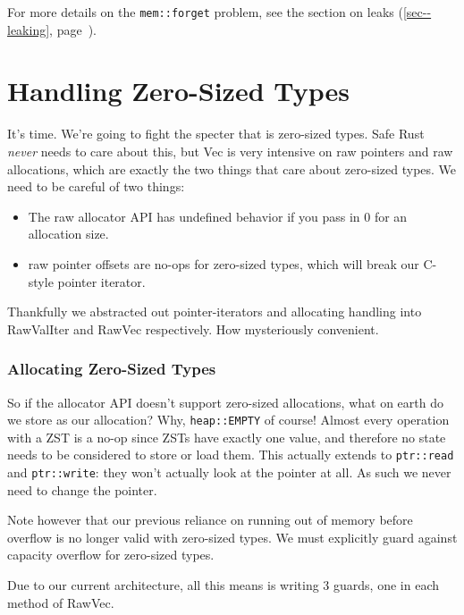 \documentclass[a4paper,]{book}
\renewcommand*{\hyperref}[2][\ar]{%
  \def\ar{#2}%
  #2 (\autoref{#1}, page~\pageref{#1})}
\begin{document}
For more details on the \texttt{mem::forget} problem, see the
\hyperref[sec--leaking]{section on leaks}.

\section{Handling Zero-Sized Types}\label{sec--vec-zsts}

It's time. We're going to fight the specter that is zero-sized types.
Safe Rust \emph{never} needs to care about this, but Vec is very
intensive on raw pointers and raw allocations, which are exactly the two
things that care about zero-sized types. We need to be careful of two
things:

\begin{itemize}
\itemsep1pt\parskip0pt
\item
  The raw allocator API has undefined behavior if you pass in 0 for an
  allocation size.
\item
  raw pointer offsets are no-ops for zero-sized types, which will break
  our C-style pointer iterator.
\end{itemize}

Thankfully we abstracted out pointer-iterators and allocating handling
into RawValIter and RawVec respectively. How mysteriously convenient.

\subsubsection{Allocating Zero-Sized
Types}\label{allocating-zero-sized-types}

So if the allocator API doesn't support zero-sized allocations, what on
earth do we store as our allocation? Why, \texttt{heap::EMPTY} of
course! Almost every operation with a ZST is a no-op since ZSTs have
exactly one value, and therefore no state needs to be considered to
store or load them. This actually extends to \texttt{ptr::read} and
\texttt{ptr::write}: they won't actually look at the pointer at all. As
such we never need to change the pointer.

Note however that our previous reliance on running out of memory before
overflow is no longer valid with zero-sized types. We must explicitly
guard against capacity overflow for zero-sized types.

Due to our current architecture, all this means is writing 3 guards, one
in each method of RawVec.
\end{document}
